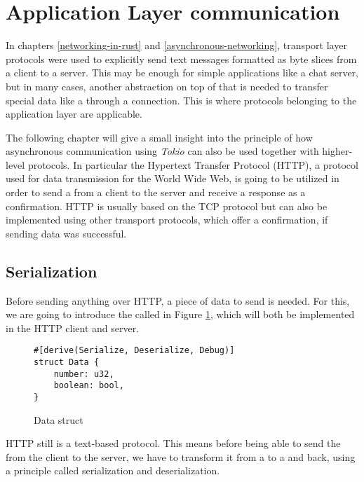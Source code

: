 
\section{Application Layer communication} \label{application-layer-communication}
In chapters \ref{networking-in-rust} and \ref{asynchronous-networking}, transport layer protocols were used to
explicitly send text messages formatted as byte slices from a client to a server. This may be enough for simple
applications like a chat server, but in many cases, another abstraction on top of that is needed to transfer special
data like a  through a connection. This is where protocols belonging to the application layer are
applicable.

The following chapter will give a small insight into the principle of how asynchronous communication using
\textit{Tokio} can also be used together with higher-level protocols. In particular the Hypertext Transfer Protocol
(HTTP), a protocol used for data transmission for the World Wide Web, is going to be utilized in order to send a
 from a client to the server and receive a response as a confirmation. HTTP is usually based on the TCP
protocol but can also be implemented using other transport protocols, which offer a confirmation, if sending data was
successful.

\subsection{Serialization}
Before sending anything over HTTP, a piece of data to send is needed. For this, we are going to introduce the
 called  in Figure \ref{data-struct}, which will both be implemented in the HTTP client and
server.

\begin{figure}[ht]
    \begin{verbatim}
#[derive(Serialize, Deserialize, Debug)]
struct Data {
    number: u32,
    boolean: bool,
}
    \end{verbatim}
    \caption{Data struct}
    \label{data-struct}
\end{figure}

HTTP still is a text-based protocol. This means before being able to send the  from the client to the
server, we have to transform it from a  to a  and back, using a principle called
serialization and deserialization.

